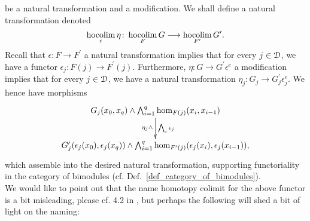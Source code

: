 \begin{defn}
\begin{displaymath}
      \end{displaymath}
      be a natural transformation and a modification.
      We shall define a natural transformation denoted
      \begin{displaymath}
        \operatorname*{hocolim}_\epsilon \eta \colon \operatorname*{hocolim}_F G \longrightarrow \operatorname*{hocolim}_{F^\prime} G^\prime.
      \end{displaymath}
      Recall that $\epsilon \colon F \to F^\prime$ a natural transformation
      implies that for every $j \in \mathcal{D}$, we have a functor $\epsilon_j \colon
      F(j) \to F^\prime(j)$.
      Furthermore, $\eta \colon G \to G^\prime \epsilon^e$ a modification
      implies that for every $j \in \mathcal{D}$, we have a natural transformation
      $\eta_j \colon G_j \to G^\prime_j\epsilon^e_j$.
      We hence have morphisms
      \begin{displaymath}
        \xymatrix{
          G_j(x_0,x_q) \wedge \bigwedge_{i=1}^q \hom_{F(j)}(x_i,x_{i-1}) %
            \ar[d]_{\eta_j \wedge}^{\bigwedge_i \epsilon_j}
          \\
          G_j^\prime(\epsilon_j(x_0),\epsilon_j(x_q)) \wedge %
            \bigwedge_{i=1}^q \hom_{F^\prime(j)}(\epsilon_j(x_i),\epsilon_j(x_{i-1})),  
        }
      \end{displaymath}
      which assemble into the desired natural transformation, supporting
      functoriality in the category of bimodules (cf.
      Def.~\ref{def_category_of_bimodules}).\\
      We would like to point out that the name homotopy colimit for the above
      functor is a bit misleading, please cf. 4.2 in \cite{brun2010covering},
      but perhaps the following will shed a bit of light on the naming:
    \end{defn}
